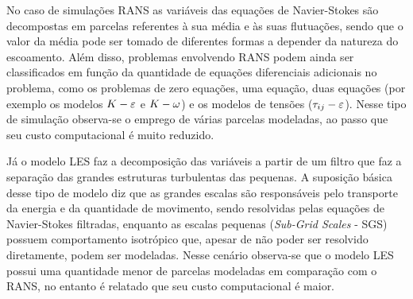 No caso de simulações RANS as variáveis das equações de Navier-Stokes são decompostas em parcelas referentes à sua média e às suas flutuações, sendo que o valor da média pode ser tomado de diferentes formas a depender da natureza do escoamento. Além disso, problemas envolvendo RANS podem ainda ser classificados em função da quantidade de equações diferenciais adicionais no problema, como os problemas de zero equações, uma equação, duas equações (por exemplo os modelos $K-\varepsilon$ e $K-\omega$) e os modelos de tensões ($\tau_{ij}-\varepsilon$). Nesse tipo de simulação observa-se o emprego de várias parcelas modeladas, ao passo que seu custo computacional é muito reduzido.

Já o modelo LES faz a decomposição das variáveis a partir de um filtro que faz a separação das grandes estruturas turbulentas das pequenas. A suposição básica desse tipo de modelo diz que as grandes escalas são responsáveis pelo transporte da energia e da quantidade de movimento, sendo resolvidas pelas equações de Navier-Stokes filtradas, enquanto as escalas pequenas (\textit{Sub-Grid Scales} - SGS) possuem comportamento isotrópico que, apesar de não poder ser resolvido diretamente, podem ser modeladas. Nesse cenário observa-se que o modelo LES possui uma quantidade menor de parcelas modeladas em comparação com o RANS, no entanto é relatado que seu custo computacional é maior.




